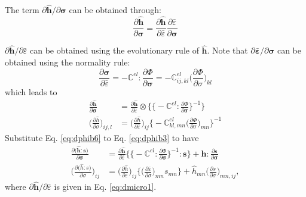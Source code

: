 \documentclass[12pt]{amsart}
\begin{document}
The term $ \partial\hat{\mathbf{h}}/ \partial\mathbf{\sigma} $ can be obtained through:
\begin{equation}
  \label{eq:dphib4}
\frac{\partial\hat{\mathbf{h}}}{\partial\mathbf{\sigma}}=\frac{\partial{\hat{\mathbf{h}}}}{\partial{\bar{\varepsilon}}}   \frac{\partial{\bar{\varepsilon}}}{\partial{\mathbf{\sigma}}}
\end{equation}

$\partial\hat{\mathbf{h}}/\partial\bar{\varepsilon} $ can be obtained using the evolutionary rule of $\hat{\mathbf{h}}$.
Note that $\partial\bar{\mathbf{\varepsilon}}/\partial\mathbf{\sigma}$ can be obtained using the normality rule:
\begin{equation}
  \label{eq:dphib5}
  \frac{\partial{\mathbf{\sigma}}}{\partial{\bar{\varepsilon}}} = - \mathbb{C}^{el} : \frac{\partial\Phi}{\partial{\mathbf{\sigma}}} = -\mathbb{C}^{el}_{ij,kl} \bigg(\frac{\partial\Phi}{\partial\sigma}\bigg)_{kl}
\end{equation}
which leads to
\begin{equation}
  \label{eq:dphib6}
  \begin{split}
      \frac{\partial\hat{\mathbf{h}}}{\partial\mathbf{\sigma}} &=\frac{\partial\hat{\mathbf{h}}}{\partial\bar{\varepsilon}}\otimes \bigg\{ \Big\{- \mathbb{C}^{el} : \frac{\partial\Phi}{\partial\mathbf{\sigma}}\Big\}^{-1} \bigg\}\\
    \bigg(\frac{\partial\hat{h}}{\partial \sigma}\bigg)_{ij,l}&=\bigg(\frac{\partial\hat{h}}{\partial\bar{\varepsilon}}\bigg)_{ij} \bigg\{- \mathbb{C}^{el}_{kl,mn} \Big(\frac{\partial\Phi}{\partial\sigma}\Big)_{mn}\bigg\}^{-1}
  \end{split}
\end{equation}
Substitute Eq. \ref{eq:dphib6} to Eq. \ref{eq:dphib3} to have
\begin{equation}
  \label{eq:dphib6_1}
  \begin{split}
    \frac{\partial \big(\hat{\mathbf{h}}:\mathbf{s}\big)  }{\partial\mathbf{\sigma}}&=\frac{\partial{\hat{\mathbf{h}}}}{\partial{\bar{\varepsilon}}} \bigg\{ \Big\{- \mathbb{C}^{el} : \frac{\partial \Phi}{\partial{\mathbf{\sigma}}}\Big\}^{-1}:\mathbf{s}\bigg\} + \hat{\mathbf{h}}:\frac{\partial\mathbf{s}}{\partial\mathbf{\sigma}}\\
    \bigg(\frac{\partial \big(\hat{h}:s\big)}{\partial \sigma}\bigg)_{ij} & = \bigg(\frac{\partial\hat{h}}{\partial\bar{\varepsilon}}\bigg)_{ij} \bigg\{\bigg(\frac{\partial\bar{\varepsilon}}{\partial\sigma}\bigg)_{mn} s_{mn}\bigg\} + \hat{h}_{mn}\bigg(\frac{\partial s}{\partial \sigma}\bigg)_{mn,ij},
  \end{split}
\end{equation}
where $\partial \hat{\mathbf{h}}/ \partial\bar{\varepsilon}$ is given in Eq. \ref{eq:dmicro1}.
\end{document}
